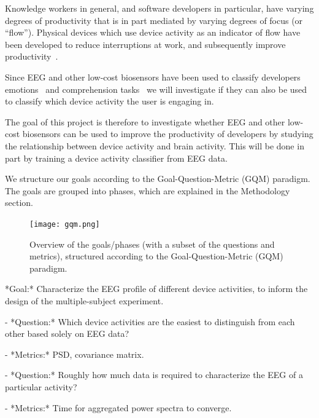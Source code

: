\documentclass{IEEEtran}
\begin{document}
\begin{refsection}

Knowledge workers in general, and software developers in particular, have varying degrees of productivity that is in part mediated by varying degrees of focus (or ``flow''). Physical devices which use device activity as an indicator of flow have been developed to reduce interruptions at work, and subsequently improve productivity~\cite{zuger_reducing_2017}.


Since EEG and other low-cost biosensors have been used to classify developers emotions~\cite{girardi_recognizing_2020} and comprehension tasks~\cite{fucci_replication_2019} we will investigate if they can also be used to classify which device activity the user is engaging in.

The goal of this project is therefore to investigate whether EEG and other low-cost biosensors can be used to improve the productivity of developers by studying the relationship between device activity and brain activity. This will be done in part by training a device activity classifier from EEG data. %

We structure our goals according to the Goal-Question-Metric (GQM) paradigm. The goals are grouped into phases, which are explained in the Methodology section.

\begin{figure}[h]
\centering
\texttt{[image: gqm.png]}
    \caption{Overview of the goals/phases (with a subset of the questions and metrics), structured according to the Goal-Question-Metric (GQM) paradigm.}\label{fig:gqm}
\end{figure}

\begin{markdown}
*Goal:* Characterize the EEG profile of different device activities, to inform the design of the multiple-subject experiment.

 - *Question:* Which device activities are the easiest to distinguish from each other based solely on EEG data?

    - *Metrics:* PSD, covariance matrix.

 - *Question:* Roughly how much data is required to characterize the EEG of a particular activity?

    - *Metrics:* Time for aggregated power spectra to converge.


\end{markdown}
\end{refsection}
\end{document}
